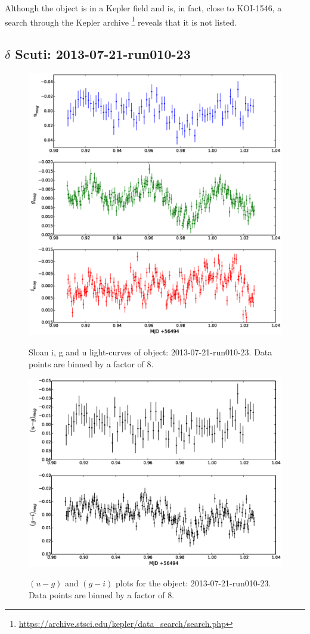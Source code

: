 Although the object is in a Kepler field and is, in fact, close to KOI-1546, a search through the Kepler archive \footnote{\url{https://archive.stsci.edu/kepler/data_search/search.php}} reveals that it is not listed. 

\subsection{$\delta$ Scuti: 2013-07-21-run010-23}

\begin{figure}
  \center
  \includegraphics[width=120mm]{images/2013-07-21-run010-23_lightcurve-bin8.eps} \\
  \caption{Sloan i, g and u light-curves of object: 2013-07-21-run010-23. Data points are binned by a factor of 8.}
  \label{fig:2013-07-21-run010-23}
\end{figure}

\begin{figure}
  \center
  \includegraphics[width=120mm]{images/2013-07-21-run010-23_colourcurve-bin8.eps} \\
  \caption{$(u - g)$ and $(g - i)$ plots for the object: 2013-07-21-run010-23. Data points are binned by a factor of 8.}
  \label{fig:2013-07-21-run010-23-colour}
\end{figure}


